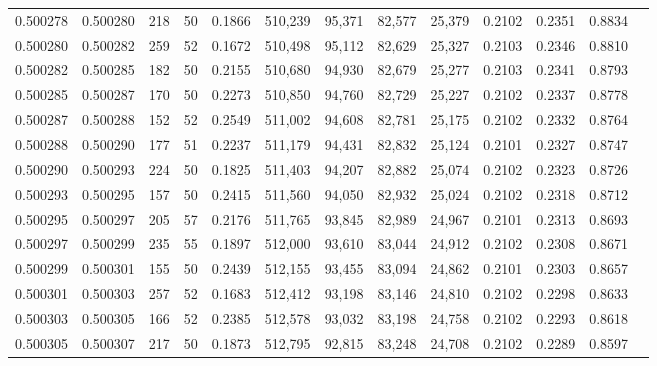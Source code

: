 \begin{tabular}{rrrrrrrrrrrrr}
0.500278 & 0.500280 & 218 &  50 &                                     0.1866 & 510,239 &  95,371 &  82,577 &  25,379 & 0.2102 & 0.2351 & 0.8834 \\
0.500280 & 0.500282 & 259 &  52 &                                     0.1672 & 510,498 &  95,112 &  82,629 &  25,327 & 0.2103 & 0.2346 & 0.8810 \\
0.500282 & 0.500285 & 182 &  50 &                                     0.2155 & 510,680 &  94,930 &  82,679 &  25,277 & 0.2103 & 0.2341 & 0.8793 \\
0.500285 & 0.500287 & 170 &  50 &                                     0.2273 & 510,850 &  94,760 &  82,729 &  25,227 & 0.2102 & 0.2337 & 0.8778 \\
0.500287 & 0.500288 & 152 &  52 &                                     0.2549 & 511,002 &  94,608 &  82,781 &  25,175 & 0.2102 & 0.2332 & 0.8764 \\
0.500288 & 0.500290 & 177 &  51 &                                     0.2237 & 511,179 &  94,431 &  82,832 &  25,124 & 0.2101 & 0.2327 & 0.8747 \\
0.500290 & 0.500293 & 224 &  50 &                                     0.1825 & 511,403 &  94,207 &  82,882 &  25,074 & 0.2102 & 0.2323 & 0.8726 \\
0.500293 & 0.500295 & 157 &  50 &                                     0.2415 & 511,560 &  94,050 &  82,932 &  25,024 & 0.2102 & 0.2318 & 0.8712 \\
0.500295 & 0.500297 & 205 &  57 &                                     0.2176 & 511,765 &  93,845 &  82,989 &  24,967 & 0.2101 & 0.2313 & 0.8693 \\
0.500297 & 0.500299 & 235 &  55 &                                     0.1897 & 512,000 &  93,610 &  83,044 &  24,912 & 0.2102 & 0.2308 & 0.8671 \\
0.500299 & 0.500301 & 155 &  50 &                                     0.2439 & 512,155 &  93,455 &  83,094 &  24,862 & 0.2101 & 0.2303 & 0.8657 \\
0.500301 & 0.500303 & 257 &  52 &                                     0.1683 & 512,412 &  93,198 &  83,146 &  24,810 & 0.2102 & 0.2298 & 0.8633 \\
0.500303 & 0.500305 & 166 &  52 &                                     0.2385 & 512,578 &  93,032 &  83,198 &  24,758 & 0.2102 & 0.2293 & 0.8618 \\
0.500305 & 0.500307 & 217 &  50 &                                     0.1873 & 512,795 &  92,815 &  83,248 &  24,708 & 0.2102 & 0.2289 & 0.8597 \\

\end{tabular}
